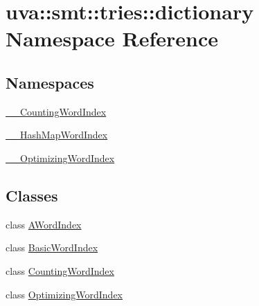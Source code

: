 \hypertarget{namespaceuva_1_1smt_1_1tries_1_1dictionary}{}\section{uva\+:\+:smt\+:\+:tries\+:\+:dictionary Namespace Reference}
\label{namespaceuva_1_1smt_1_1tries_1_1dictionary}
\subsection*{Namespaces}
\begin{DoxyCompactItemize}
\item 
 \hyperlink{namespaceuva_1_1smt_1_1tries_1_1dictionary_1_1_____counting_word_index}{\+\_\+\+\_\+\+Counting\+Word\+Index}
\item 
 \hyperlink{namespaceuva_1_1smt_1_1tries_1_1dictionary_1_1_____hash_map_word_index}{\+\_\+\+\_\+\+Hash\+Map\+Word\+Index}
\item 
 \hyperlink{namespaceuva_1_1smt_1_1tries_1_1dictionary_1_1_____optimizing_word_index}{\+\_\+\+\_\+\+Optimizing\+Word\+Index}
\end{DoxyCompactItemize}
\subsection*{Classes}
\begin{DoxyCompactItemize}
\item 
class \hyperlink{classuva_1_1smt_1_1tries_1_1dictionary_1_1_a_word_index}{A\+Word\+Index}
\item 
class \hyperlink{classuva_1_1smt_1_1tries_1_1dictionary_1_1_basic_word_index}{Basic\+Word\+Index}
\item 
class \hyperlink{classuva_1_1smt_1_1tries_1_1dictionary_1_1_counting_word_index}{Counting\+Word\+Index}
\item 
class \hyperlink{classuva_1_1smt_1_1tries_1_1dictionary_1_1_optimizing_word_index}{Optimizing\+Word\+Index}
\end{DoxyCompactItemize}
